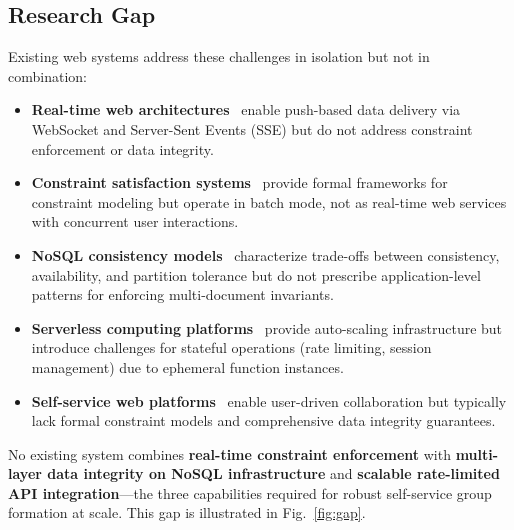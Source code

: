\documentclass[11pt,a4paper]{article}
\theoremstyle{plain}
\theoremstyle{definition}
\begin{document}
\subsection{Research Gap}

Existing web systems address these challenges in isolation but not in combination:

\begin{itemize}[noitemsep,topsep=4pt]
    \item \textbf{Real-time web architectures}~\cite{pimentel2012, lubbers2010} enable push-based data delivery via WebSocket and Server-Sent Events (SSE) but do not address constraint enforcement or data integrity.
    \item \textbf{Constraint satisfaction systems}~\cite{rossi2006, kumar1992} provide formal frameworks for constraint modeling but operate in batch mode, not as real-time web services with concurrent user interactions.
    \item \textbf{NoSQL consistency models}~\cite{brewer2000, gilbert2002, decandia2007} characterize trade-offs between consistency, availability, and partition tolerance but do not prescribe application-level patterns for enforcing multi-document invariants.
    \item \textbf{Serverless computing platforms}~\cite{jonas2017, baldini2017, schleier-smith2021} provide auto-scaling infrastructure but introduce challenges for stateful operations (rate limiting, session management) due to ephemeral function instances.
    \item \textbf{Self-service web platforms}~\cite{bafoutsou2002, olson2000} enable user-driven collaboration but typically lack formal constraint models and comprehensive data integrity guarantees.
\end{itemize}

No existing system combines \textbf{real-time constraint enforcement} with \textbf{multi-layer data integrity on NoSQL infrastructure} and \textbf{scalable rate-limited API integration}---the three capabilities required for robust self-service group formation at scale. This gap is illustrated in Fig.~\ref{fig:gap}.
\end{document}
